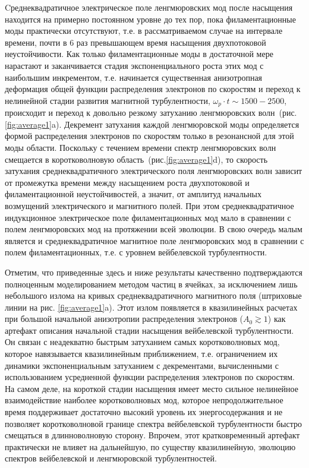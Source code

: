 Cреднеквадратичное электрическое поле ленгмюровских мод после насыщения находится на примерно постоянном уровне до тех пор, пока филаментационные моды практически отсутствуют, т.е. в рассматриваемом случае на интервале времени, почти в 6 раз превышающем время насыщения двухпотоковой неустойчивости. Как только филаментационные моды в достаточной мере нарастают и заканчивается стадия экспоненциального роста этих мод с наибольшим инкрементом, т.е. начинается существенная анизотропная деформация общей функции распределения электронов по скоростям и переход к нелинейной стадии развития магнитной турбулентности, $\omega_p\cdot t\sim1500-2500$, происходит и переход к довольно резкому затуханию ленгмюровских волн~(рис.\ref{fig:average1}a). Декремент затухания каждой ленгмюровской моды определяется формой распределения электронов по скоростям только в резонансной для этой моды области. Поскольку с течением времени спектр ленгмюровских волн смещается в коротковолновую область~(рис.\ref{fig:average1}d), то скорость затухания среднеквадратичного электрического поля ленгмюровских волн зависит от промежутка времени между насыщением роста двухпотоковой и филаментационной неустойчивостей, а значит, от амплитуд начальных возмущений электрического и магнитного полей. При этом среднеквадратичное индукционное электрическое поле филаментационных мод мало в сравнении с полем ленгмюровских мод на протяжении всей эволюции. В свою очередь малым является и среднеквадратичное магнитное поле ленгмюровских мод в сравнении с полем филаментационных, т.е. с уровнем вейбелевской турбулентности. 

Отметим, что приведенные здесь и ниже результаты качественно подтверждаются полноценным моделированием методом частиц в ячейках, за исключением лишь небольшого излома на кривых среднеквадратичного магнитного поля (штриховые линии на рис. \ref{fig:average1}a). Этот излом появляется в квазилинейных расчетах при большой начальной анизотропии распределения электронов ($A_0\gtrsim1$) как артефакт описания начальной стадии насыщения вейбелевской турбулентности. Он связан с неадекватно быстрым затуханием самых коротковолновых мод, которое навязывается квазилинейным приближением, т.е. ограничением их динамики экспоненциальным затуханием с декрементами, вычисленными с использованием усредненной функции распределения электронов по скоростям. На самом деле, на короткой стадии насыщения имеет место сильное нелинейное взаимодействие наиболее коротковолновых мод, которое непродолжительное время поддерживает достаточно высокий уровень их энергосодержания и не позволяет коротковолновой границе спектра вейбелевской турбулентности быстро смещаться в длинноволновую сторону. Впрочем, этот кратковременный артефакт практически не влияет на дальнейшую, по существу квазилинейную, эволюцию спектров вейбелевской и ленгмюровской турбулентностей.

